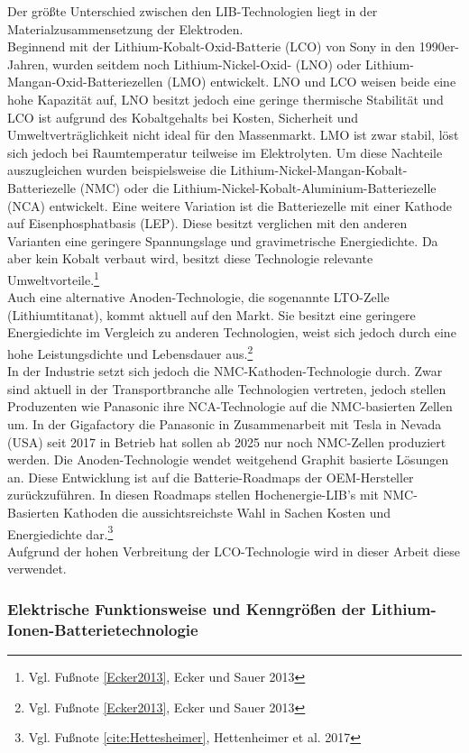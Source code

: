Der größte Unterschied zwischen den LIB-Technologien liegt in der Materialzusammensetzung der Elektroden.\\
Beginnend mit der Lithium-Kobalt-Oxid-Batterie (LCO) von Sony in den 1990er-Jahren, wurden seitdem noch Lithium-Nickel-Oxid- (LNO) oder Lithium-Mangan-Oxid-Batteriezellen (LMO) entwickelt. LNO und LCO weisen beide eine hohe Kapazität auf, LNO besitzt jedoch eine geringe thermische Stabilität und LCO ist aufgrund des Kobaltgehalts bei Kosten, Sicherheit und Umweltverträglichkeit nicht ideal für den Massenmarkt. LMO ist zwar stabil, löst sich jedoch bei Raumtemperatur teilweise im Elektrolyten. Um diese Nachteile auszugleichen wurden beispielsweise die Lithium-Nickel-Mangan-Kobalt-Batteriezelle (NMC) oder die Lithium-Nickel-Kobalt-Aluminium-Batteriezelle (NCA) entwickelt. Eine weitere Variation ist die Batteriezelle mit einer Kathode auf Eisenphosphatbasis (LEP). Diese besitzt verglichen mit den anderen Varianten eine geringere Spannungslage und gravimetrische Energiedichte. Da aber kein Kobalt verbaut wird, besitzt diese Technologie relevante Umweltvorteile.\footnote{Vgl. Fußnote \ref{Ecker2013}, Ecker und Sauer 2013}\\
Auch eine alternative Anoden-Technologie, die sogenannte LTO-Zelle (Lithiumtitanat), kommt aktuell auf den Markt. Sie besitzt eine geringere Energiedichte im Vergleich zu anderen Technologien, weist sich jedoch durch eine hohe Leistungsdichte und Lebensdauer aus.\footnote{Vgl. Fußnote \ref{Ecker2013}, Ecker und Sauer 2013}  \\
In der Industrie setzt sich jedoch die NMC-Kathoden-Technologie durch. Zwar sind aktuell in der Transportbranche alle Technologien vertreten, jedoch stellen Produzenten wie Panasonic ihre NCA-Technologie auf die NMC-basierten Zellen um. In der Gigafactory die Panasonic in Zusammenarbeit mit Tesla in Nevada (USA) seit 2017 in Betrieb hat sollen ab 2025 nur noch NMC-Zellen produziert werden. Die Anoden-Technologie wendet weitgehend Graphit basierte Lösungen an. Diese Entwicklung ist auf die Batterie-Roadmaps der OEM-Hersteller zurückzuführen. In diesen Roadmaps stellen Hochenergie-LIB's mit NMC-Basierten Kathoden die aussichtsreichste Wahl in Sachen Kosten und Energiedichte dar.\footnote{Vgl. Fußnote \ref{cite:Hettesheimer}, Hettenheimer et al. 2017} \\
Aufgrund der hohen Verbreitung der LCO-Technologie wird in dieser Arbeit diese verwendet.%

\subsubsection*{Elektrische Funktionsweise und Kenngrößen der Lithium-Ionen-Batterietechnologie}\label{subsub:ElekChemFunktion}

